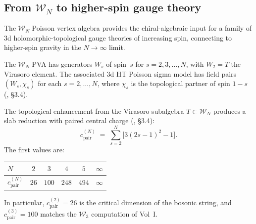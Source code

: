 

\subsection{From \texorpdfstring{$\mathcal{W}_N$}{W\_N} to higher-spin gauge theory}

\providecommand{\ModEnv}{\operatorname{ModEnv}}

The $\mathcal{W}_N$ Poisson vertex algebra provides the chiral-algebraic
input for a family of 3d holomorphic-topological gauge theories of
increasing spin, connecting to higher-spin gravity in the $N \to \infty$
limit.

\begin{definition}
The $\mathcal{W}_N$ PVA has generators $W_s$ of spin~$s$ for
$s = 2, 3, \ldots, N$, with $W_2 = T$ the Virasoro element. The
associated 3d HT Poisson sigma model has field pairs $(W_s, \chi_s)$
for each $s = 2, \ldots, N$, where $\chi_s$ is the topological partner
of spin $1-s$ \textup{(}\!\cite{KZ25}, \S3.4\textup{)}.
\end{definition}

\begin{proposition}
The topological enhancement from the Virasoro subalgebra $T \subset
\mathcal{W}_N$ produces a slab reduction with paired central charge
\textup{(}\!\cite{KZ25}, \S3.4\textup{)}:
\begin{equation}%
c_{\mathrm{pair}}^{(N)}
\;=\;
\sum_{s=2}^{N} \bigl[3(2s-1)^2 - 1\bigr].
\end{equation}
The first values are:
\begin{center}
\renewcommand{\arraystretch}{1.2}
\begin{tabular}{lccccc}
\toprule
$N$ & $2$ & $3$ & $4$ & $5$ & $\infty$ \\
\midrule
$c_{\mathrm{pair}}^{(N)}$ & $26$ & $100$ & $248$ & $494$ & $\infty$ \\
\bottomrule
\end{tabular}
\end{center}
In particular, $c_{\mathrm{pair}}^{(2)} = 26$ is the critical dimension of
the bosonic string, and $c_{\mathrm{pair}}^{(3)} = 100$ matches the
$\mathcal{W}_3$ computation of Vol~I.
\end{proposition}

